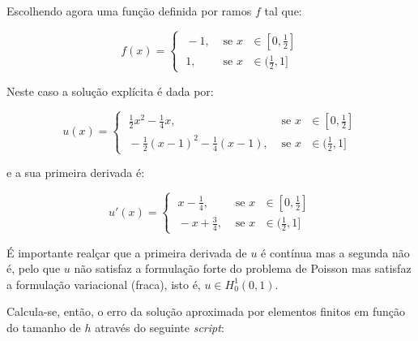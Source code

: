\documentclass{article}
\theoremstyle{definition}
\theoremstyle{plain}
\numberwithin{equation}{section}
\newcommand{\tab}{\hspace{10mm}}
\begin{document}
Escolhendo agora uma função definida por ramos $f$ tal que:

\begin{equation*}
     f(x) = \begin{cases} \;-1, & \mbox{ se } x\mbox{ $\in [0,\frac{1}{2}]$} \\ \; 1, & \mbox{ se }  x\mbox{ $\in (\frac{1}{2},1] $}
     \end{cases}
\end{equation*}

Neste caso a solução explícita é dada por:

\begin{equation*}
     u(x) = \begin{cases} \; \frac{1}{2}x^2 - \frac{1}{4}x, & \mbox{ se } x\mbox{ $\in [0,\frac{1}{2}]$} \\ \; -\frac{1}{2}(x-1)^2 - \frac{1}{4}(x-1), & \mbox{ se }  x\mbox{ $\in (\frac{1}{2},1] $}
     \end{cases}
\end{equation*}

e a sua primeira derivada é:

\begin{equation*}
     u'(x) = \begin{cases} \; x - \frac{1}{4}, & \mbox{ se } x\mbox{ $\in [0,\frac{1}{2}]$} \\ \;  -x  + \frac{3}{4}, & \mbox{ se }  x\mbox{ $\in (\frac{1}{2},1] $}
     \end{cases}
\end{equation*}
\vspace{1mm}

\tab É importante realçar que a primeira derivada de $u$ é contínua mas a segunda não é, pelo que $u$ não satisfaz a formulação forte do problema de Poisson mas satisfaz a formulação variacional (fraca), isto é, $u \in H_0^1(0,1)$.

Calcula-se, então, o erro da solução aproximada por elementos finitos em função do tamanho de $h$ através do seguinte \emph{script}:

\vspace{1mm}
\end{document}

